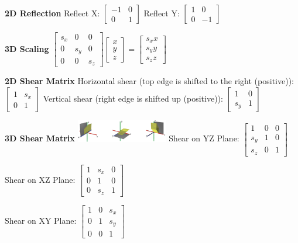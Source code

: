 \documentclass[letterpaper, 8pt]{extarticle}
\begin{document}
\begin{multicols*}{4}
\textbf{2D Reflection}
Reflect X:\@
\(
\begin{bmatrix} -1 & 0 \\ 0 & 1 \end{bmatrix}
\)
Reflect Y:\@
\(
\begin{bmatrix} 1 & 0 \\ 0 & -1 \end{bmatrix}
\)

\textbf{3D Scaling}
\(
\begin{bmatrix}
    s_x & 0   & 0   \\
    0   & s_y & 0   \\
    0   & 0   & s_z
\end{bmatrix}
\begin{bmatrix}
    x \\ y \\ z
\end{bmatrix}
=
\begin{bmatrix}
    s_x x \\ s_y y \\ s_z z
\end{bmatrix}
\)

\textbf{2D Shear Matrix}
Horizontal shear (top edge is shifted to the right (positive)):
\(
\begin{bmatrix}
    1 & s_x \\
    0 & 1
\end{bmatrix}
\)
Vertical shear (right edge is shifted up (positive)):
\(
\begin{bmatrix}
    1   & 0 \\
    s_y & 1
\end{bmatrix}
\)

\textbf{3D Shear Matrix}
\includegraphics[width=4cm]{3d-shear.png}
Shear on YZ Plane:
\(
\begin{bmatrix}
    1   & 0 & 0 \\
    s_y & 1 & 0 \\
    s_z & 0 & 1
\end{bmatrix}
\)

Shear on XZ Plane:
\(
\begin{bmatrix}
    1 & s_x & 0 \\
    0 & 1   & 0 \\
    0 & s_z & 1
\end{bmatrix}
\)

Shear on XY Plane:
\(
\begin{bmatrix}
    1 & 0 & s_x \\
    0 & 1 & s_y \\
    0 & 0 & 1
\end{bmatrix}
\)


\end{multicols*}
\end{document}
